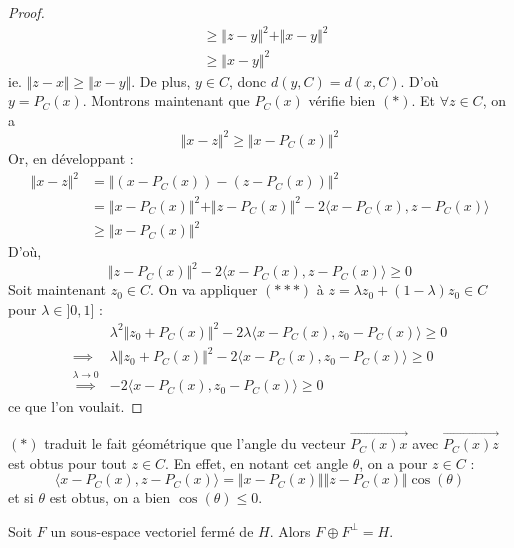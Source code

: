 \begin{proof}
\begin{align*}
      &\geq \Vert z - y \Vert^2 + \Vert x - y \Vert^2 \\
      &\geq \Vert x - y \Vert^2
    \end{align*}
    ie. $\Vert z - x \Vert \geq \Vert x - y \Vert$. De plus, $y \in C$, donc $d(y, C) = d(x, C)$. D'où $y = P_C(x)$.
    \newpar
    Montrons maintenant que $P_C(x)$ vérifie bien $(*)$. Et $\forall z \in C$, on a
    \[ \Vert x - z \Vert^2 \geq \Vert x - P_C(x) \Vert^2 \]
    Or, en développant :
    \begin{align*}
      \Vert x - z \Vert^2 &= \Vert (x - P_C(x)) - (z - P_C(x)) \Vert^2 \\
      &= \Vert x - P_C(x) \Vert^2 + \Vert z - P_C(x) \Vert^2 - 2 \langle x - P_C(x), z - P_C(x) \rangle \\
      &\geq \Vert x - P_C(x) \Vert^2
    \end{align*}
    D'où,
    \[ \Vert z - P_C(x) \Vert^2 - 2 \langle x - P_C(x), z - P_C(x) \rangle \geq 0 \tag{$***$} \]
    Soit maintenant $z_0 \in C$. On va appliquer $(***)$ à $z = \lambda z_0 + (1 - \lambda) z_0 \in C$ pour $\lambda \in ]0, 1]$ :
    \begin{align*}
      & \lambda^2 \Vert z_0 + P_C(x) \Vert^2 -2 \lambda \langle x - P_C(x), z_0 - P_C(x) \rangle \geq 0 \\
      \implies& \lambda \Vert z_0 + P_C(x) \Vert^2 -2 \langle x - P_C(x), z_0 - P_C(x) \rangle \geq 0 \\
      \overset{\lambda \longrightarrow 0}{\implies}& -2 \langle x - P_C(x), z_0 - P_C(x) \rangle \geq 0
    \end{align*}
    ce que l'on voulait.
  \end{proof}

  \begin{remark}
    $(*)$ traduit le fait géométrique que l'angle du vecteur $\overrightarrow{P_C(x)x}$ avec $\overrightarrow{P_C(x)z}$ est obtus pour tout $z \in C$. En effet, en notant cet angle $\theta$, on a pour $z \in C$ :
    \[ \langle x - P_C(x), z - P_C(x) \rangle = \Vert x - P_C(x) \Vert \Vert z - P_C(x) \Vert \cos (\theta) \]
    et si $\theta$ est obtus, on a bien $\cos (\theta) \leq 0$.
  \end{remark}

  \begin{corollary}
    Soit $F$ un sous-espace vectoriel fermé de $H$. Alors $F \oplus F^\perp = H$.
  \end{corollary}

